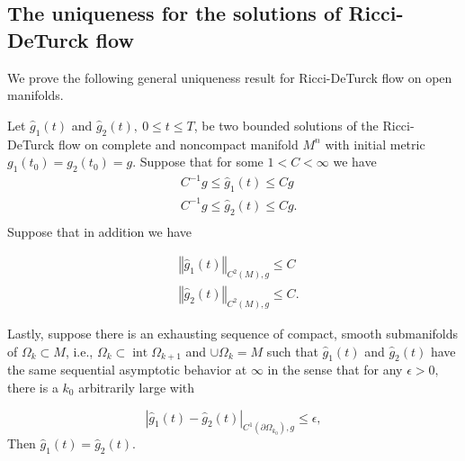 \subsection{The uniqueness for the solutions of Ricci-DeTurck flow}

We prove the following general uniqueness result for Ricci-DeTurck
flow on open manifolds.

\begin{proposition}
\label{prop:ricci-deturck-uniqueness-noncompact}
\label{RDuniq}
Let $\hat g_1(  t)  $ and $\hat g_2(  t),\ 0 \leq t\leq T $, be two
bounded solutions of the Ricci-DeTurck flow on complete and
noncompact manifold $M^{n}$ with initial metric $g_1( t_0) =g_2(t_
0)  =g$. Suppose that for some $1<C<\infty$ we have
\begin{align*}
& C^{-1}  g    \leq \hat g_1( t) \leq C  g \\
& C^{-1}  g   \leq \hat g_2(  t) \leq C g .\\
\end{align*}
Suppose that in addition we have


\begin{align*}
& \left\Vert \hat g_1(t) \right\Vert _{C^{2}\left(M\right),g} \le C \\
& \left\Vert \hat g_2(t) \right\Vert _{C^{2}\left(M\right),g} \le
C.
\end{align*}




Lastly, suppose there is an exhausting sequence of compact, smooth
submanifolds of $\Omega_{k}\subset M$, i.e., $\Omega _{k}\subset\operatorname{int}\Omega_{k+1}$ and $\cup\Omega_{k}=M$ such that $\hat g_1\left(
t\right)$ and $\hat g_2(t)$ have the same sequential asymptotic
behavior at $\infty$ in the sense that for any $\epsilon>0,$ there
is a $k_0$ arbitrarily large with

\[
\left\vert \hat g_1(  t)  -\hat g_2(  t) \right\vert
_{C^{1}\left(\partial\Omega_{k_0}\right) ,g}\leq\epsilon,
\]
Then $ \hat g_1(  t)  =\hat g_2(  t)$.
\end{proposition}


